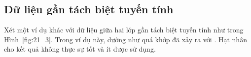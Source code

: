  
\subsection{Dữ liệu gần tách biệt tuyến tính}
 
Xét một ví dụ khác với dữ liệu giữa hai lớp gần tách biệt tuyến tính như trong Hình~\ref{fig:21_3}. Trong ví dụ này, dường như quá khớp đã xảy ra với . Hạt nhân  cho kết quả không thực sự tốt và ít được sử dụng.  
 
 
